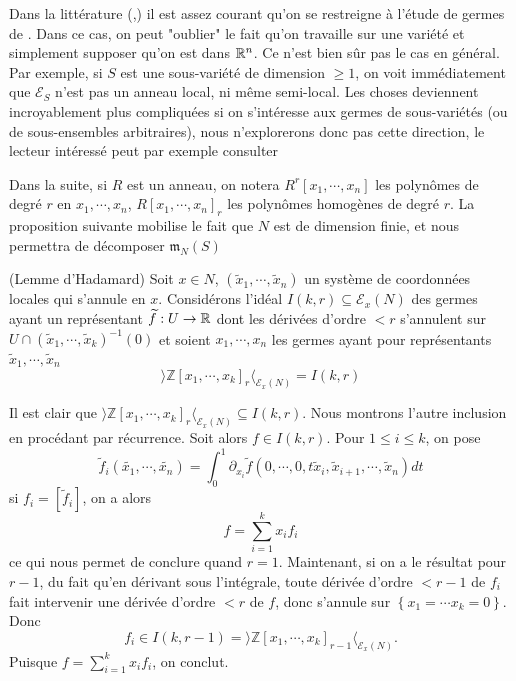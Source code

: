 \documentclass[memoire.tex]{subfiles}
\begin{document}
\begin{remarque}
    Dans la littérature (\cite{damon1984unfolding},\cite{montaldi2021sbc}) il est assez courant qu'on se restreigne à l'étude de germes de . Dans ce cas, on peut "oublier" le fait qu'on travaille sur une variété et simplement supposer qu'on est dans $\mathbb{R}^n$. Ce n'est bien sûr pas le cas en général. Par exemple, si $S$ est une sous-variété de dimension $\geq 1$, on voit immédiatement que $\mathcal{E}_S$ n'est pas un anneau local, ni même semi-local. Les choses deviennent incroyablement plus compliquées si on s'intéresse aux germes de sous-variétés (ou de sous-ensembles arbitraires), nous n'explorerons donc pas cette direction, le lecteur intéressé peut par exemple consulter \cite{Tougeron1972Ideaux}
\end{remarque}

Dans la suite, si $R$ est un anneau, on notera $R^r[x_1,\cdots,x_n]$ les polynômes de degré $r$ en $x_1,\cdots,x_n$, $R[x_1,\cdots,x_n]_r$ les polynômes homogènes de degré $r$.
La proposition suivante mobilise le fait que $N$ est de dimension finie, et nous permettra de décomposer $\mathfrak{m}_N(S)$


\begin{proposition}(Lemme d'Hadamard)\label{Hadamard}
Soit $x\in N$, $(\tilde{x}_1,\cdots,\tilde{x}_n)$ un système de coordonnées 
locales qui s'annule en $x$. Considérons l'idéal $I(k,r)\subseteq \mathcal{E}_x(N)$ 
des germes ayant un représentant $\widetilde{f}: U\rightarrow \mathbb{R}$ 
dont les dérivées d'ordre $<r$ s'annulent sur $ 
U\cap(\tilde{x}_1,\cdots,\tilde{x}_k)^{-1}(0)$ et soient $x_1,\cdots,x_n$ les germes  ayant pour représentants $\tilde{x}_1,\cdots,\tilde{x}_n$
    \begin{equation*}
     \rangle \mathbb{Z}[x_1,\cdots,x_k]_{r} \langle_{\mathcal{E}_x(N)}=I(k,r)
    \end{equation*}
\end{proposition}
\begin{preuve}
Il est clair que $ \rangle \mathbb{Z}[x_1,\cdots,x_k]_{r} \langle_{\mathcal{E}_x(N)}\subseteq I(k,r)$. Nous montrons l'autre inclusion en procédant par récurrence. Soit alors $f\in I(k,r)$. Pour $1\leq i\leq k$, on pose 
\begin{equation*}
    \tilde{f}_i(\tilde{x_1},\cdots,\tilde{x_n})=\int_{0}^
    {1}  \partial_{x_i} \tilde{f}(0,\cdots,0,t\tilde{x}_i,\tilde{x}_{i
    +1},\cdots,\tilde{x}_n)dt
\end{equation*}
si $f_i=[\tilde{f}_i]$, on a alors
\begin{equation*}
    f=\sum_{i=1}^{k}x_i f_i
\end{equation*}
ce qui nous permet de conclure quand $r=1$. Maintenant, si on a le résultat pour $r-1$, du fait qu'en dérivant sous l'intégrale, toute dérivée d'ordre $<r-1$ de $f_i$ fait intervenir une dérivée d'ordre $<r$ de $f$, donc s'annule sur $\left\{x_1=\cdots x_k=0\right\}$. Donc 
\begin{equation*}
f_i\in I(k,r-1)=\rangle \mathbb{Z}[x_1,\cdots,x_k]_{r-1} \langle_{\mathcal{E}_x(N)}.
\end{equation*} Puisque $f=\sum_{i=1}^{k}x_if_i$, on conclut.
\end{preuve}
\end{document}
